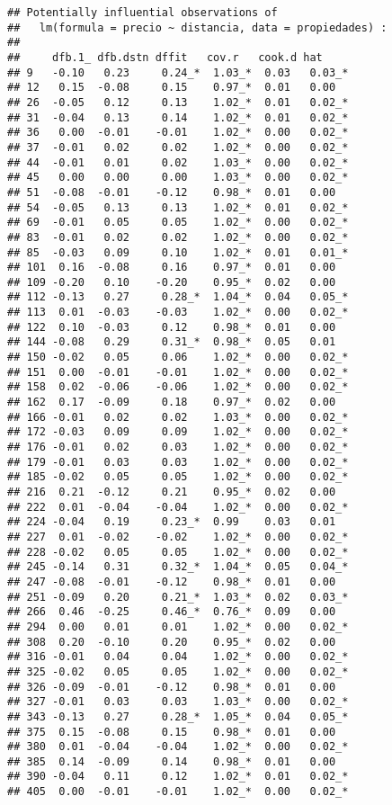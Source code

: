 \documentclass[
]{article}
\begin{document}
\begin{verbatim}
## Potentially influential observations of
##   lm(formula = precio ~ distancia, data = propiedades) :
## 
##     dfb.1_ dfb.dstn dffit   cov.r   cook.d hat    
## 9   -0.10   0.23     0.24_*  1.03_*  0.03   0.03_*
## 12   0.15  -0.08     0.15    0.97_*  0.01   0.00  
## 26  -0.05   0.12     0.13    1.02_*  0.01   0.02_*
## 31  -0.04   0.13     0.14    1.02_*  0.01   0.02_*
## 36   0.00  -0.01    -0.01    1.02_*  0.00   0.02_*
## 37  -0.01   0.02     0.02    1.02_*  0.00   0.02_*
## 44  -0.01   0.01     0.02    1.03_*  0.00   0.02_*
## 45   0.00   0.00     0.00    1.03_*  0.00   0.02_*
## 51  -0.08  -0.01    -0.12    0.98_*  0.01   0.00  
## 54  -0.05   0.13     0.13    1.02_*  0.01   0.02_*
## 69  -0.01   0.05     0.05    1.02_*  0.00   0.02_*
## 83  -0.01   0.02     0.02    1.02_*  0.00   0.02_*
## 85  -0.03   0.09     0.10    1.02_*  0.01   0.01_*
## 101  0.16  -0.08     0.16    0.97_*  0.01   0.00  
## 109 -0.20   0.10    -0.20    0.95_*  0.02   0.00  
## 112 -0.13   0.27     0.28_*  1.04_*  0.04   0.05_*
## 113  0.01  -0.03    -0.03    1.02_*  0.00   0.02_*
## 122  0.10  -0.03     0.12    0.98_*  0.01   0.00  
## 144 -0.08   0.29     0.31_*  0.98_*  0.05   0.01  
## 150 -0.02   0.05     0.06    1.02_*  0.00   0.02_*
## 151  0.00  -0.01    -0.01    1.02_*  0.00   0.02_*
## 158  0.02  -0.06    -0.06    1.02_*  0.00   0.02_*
## 162  0.17  -0.09     0.18    0.97_*  0.02   0.00  
## 166 -0.01   0.02     0.02    1.03_*  0.00   0.02_*
## 172 -0.03   0.09     0.09    1.02_*  0.00   0.02_*
## 176 -0.01   0.02     0.03    1.02_*  0.00   0.02_*
## 179 -0.01   0.03     0.03    1.02_*  0.00   0.02_*
## 185 -0.02   0.05     0.05    1.02_*  0.00   0.02_*
## 216  0.21  -0.12     0.21    0.95_*  0.02   0.00  
## 222  0.01  -0.04    -0.04    1.02_*  0.00   0.02_*
## 224 -0.04   0.19     0.23_*  0.99    0.03   0.01  
## 227  0.01  -0.02    -0.02    1.02_*  0.00   0.02_*
## 228 -0.02   0.05     0.05    1.02_*  0.00   0.02_*
## 245 -0.14   0.31     0.32_*  1.04_*  0.05   0.04_*
## 247 -0.08  -0.01    -0.12    0.98_*  0.01   0.00  
## 251 -0.09   0.20     0.21_*  1.03_*  0.02   0.03_*
## 266  0.46  -0.25     0.46_*  0.76_*  0.09   0.00  
## 294  0.00   0.01     0.01    1.02_*  0.00   0.02_*
## 308  0.20  -0.10     0.20    0.95_*  0.02   0.00  
## 316 -0.01   0.04     0.04    1.02_*  0.00   0.02_*
## 325 -0.02   0.05     0.05    1.02_*  0.00   0.02_*
## 326 -0.09  -0.01    -0.12    0.98_*  0.01   0.00  
## 327 -0.01   0.03     0.03    1.03_*  0.00   0.02_*
## 343 -0.13   0.27     0.28_*  1.05_*  0.04   0.05_*
## 375  0.15  -0.08     0.15    0.98_*  0.01   0.00  
## 380  0.01  -0.04    -0.04    1.02_*  0.00   0.02_*
## 385  0.14  -0.09     0.14    0.98_*  0.01   0.00  
## 390 -0.04   0.11     0.12    1.02_*  0.01   0.02_*
## 405  0.00  -0.01    -0.01    1.02_*  0.00   0.02_*
\end{verbatim}
\end{document}

